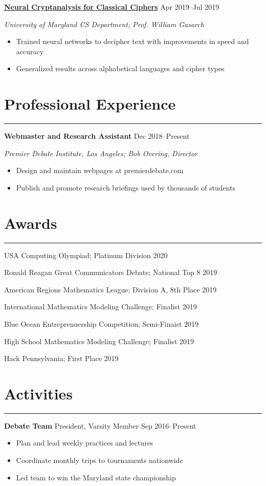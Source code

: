 \documentclass[11pt]{article}
\newcommand{\resumesection}[1]{\vspace{-0.3cm}\section*{\color{highlight}#1}\vspace{-0.3cm}\hrule\vspace{0.3cm}}
\begin{document}
\textbf{\href{https://github.com/petezh/Neural-Cryptanalysis}{Neural Cryptanalysis for Classical Ciphers}} \hfill Apr 2019--Jul 2019\par
\textit{University of Maryland CS Department; Prof. William Gasarch}
\begin{itemize}
	\item Trained neural networks to decipher text with improvements in speed and accuracy
	\item Generalized results across alphabetical languages and cipher types
\end{itemize}\vspace{0.1cm}


\resumesection{Professional Experience}

\textbf{Webmaster and Research Assistant}   \hfill Dec 2018--Present \par
\textit{Premier Debate Institute, Los Angeles; Bob Overing, Director}
\begin{itemize}
	\item Design and maintain webpages at premierdebate.com
	\item Publish and promote research briefings used by thousands of students
\end{itemize}

\resumesection{Awards}

USA Computing Olympiad; Platinum Division \hfill 2020 \par
Ronald Reagan Great Communicators Debate; National Top 8 \hfill 2019 \par
American Regions Mathematics League; Division A, 8th Place \hfill 2019 \par
International Mathematics Modeling Challenge; Finalist \hfill 2019\par
Blue Ocean Entreprenuership Competition; Semi-Finaist \hfill 2019 \par
High School Mathematics Modeling Challenge; Finalist \hfill 2019\par
Hack Pennsylvania; First Place \hfill 2019\par


\resumesection{Activities}

\textbf{Debate Team} President, Varsity Member \hfill Sep 2016--Present \par
\begin{itemize}
	\item Plan and lead weekly practices and lectures
	\item Coordinate monthly trips to tournaments nationwide
	\item Led team to win the Maryland state championship
\end{itemize}\vspace{0.1cm}
\end{document}
